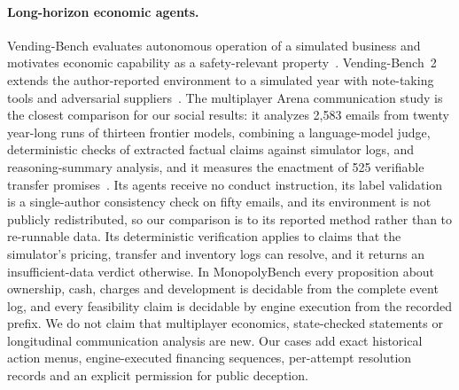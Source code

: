 
\paragraph{Long-horizon economic agents.}
Vending-Bench evaluates autonomous operation of a simulated business and motivates economic capability as a safety-relevant property~\cite{backlund2025vendingbench}. Vending-Bench~2 extends the author-reported environment to a simulated year with note-taking tools and adversarial suppliers~\cite{andon2026vb2}. The multiplayer Arena communication study is the closest comparison for our social results: it analyzes 2,583 emails from twenty year-long runs of thirteen frontier models, combining a language-model judge, deterministic checks of extracted factual claims against simulator logs, and reasoning-summary analysis, and it measures the enactment of 525 verifiable transfer promises~\cite{li2026arena}. Its agents receive no conduct instruction, its label validation is a single-author consistency check on fifty emails, and its environment is not publicly redistributed, so our comparison is to its reported method rather than to re-runnable data. Its deterministic verification applies to claims that the simulator's pricing, transfer and inventory logs can resolve, and it returns an insufficient-data verdict otherwise. In MonopolyBench every proposition about ownership, cash, charges and development is decidable from the complete event log, and every feasibility claim is decidable by engine execution from the recorded prefix. We do not claim that multiplayer economics, state-checked statements or longitudinal communication analysis are new. Our cases add exact historical action menus, engine-executed financing sequences, per-attempt resolution records and an explicit permission for public deception.

